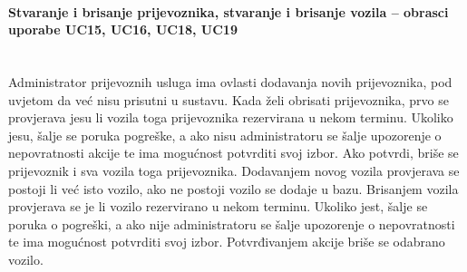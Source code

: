				\eject
				
				\paragraph{Stvaranje i brisanje prijevoznika, stvaranje i brisanje vozila – obrasci uporabe UC15, UC16, UC18, UC19 }\mbox{} \\
				Administrator prijevoznih usluga ima ovlasti dodavanja novih prijevoznika, pod uvjetom da već nisu prisutni u sustavu. Kada želi obrisati prijevoznika, prvo se provjerava jesu li vozila toga prijevoznika rezervirana u nekom terminu. Ukoliko jesu, šalje se poruka pogreške, a ako nisu administratoru se šalje upozorenje o nepovratnosti akcije te ima mogućnost potvrditi svoj izbor. Ako potvrdi, briše se prijevoznik i sva vozila toga prijevoznika. Dodavanjem novog vozila provjerava se postoji li već isto vozilo, ako ne postoji vozilo se dodaje u bazu. Brisanjem vozila provjerava se je li vozilo rezervirano u nekom terminu. Ukoliko jest, šalje se poruka o pogreški, a ako nije administratoru se šalje upozorenje o nepovratnosti te ima mogućnost potvrditi svoj izbor. Potvrđivanjem akcije briše se odabrano vozilo. 
				
